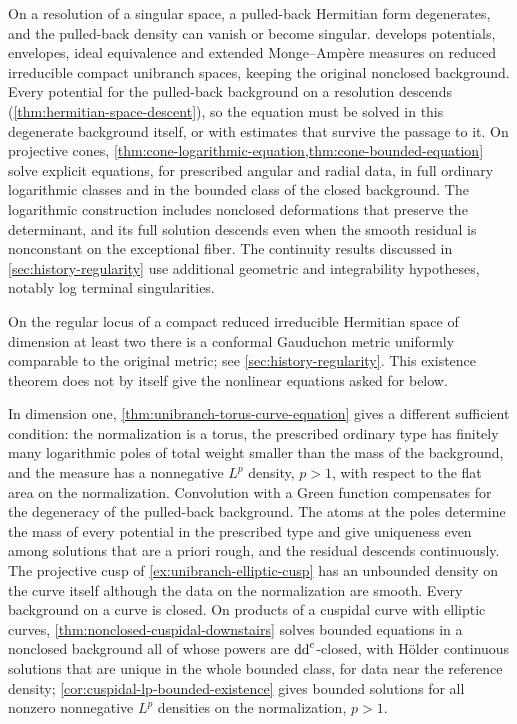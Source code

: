 On a resolution of a singular space, a pulled-back Hermitian form degenerates, and the pulled-back density can vanish or become singular.  develops potentials, envelopes, ideal equivalence and extended Monge--Amp\`ere measures on reduced irreducible compact unibranch spaces, keeping the original nonclosed background. Every potential for the pulled-back background on a resolution descends (\cref{thm:hermitian-space-descent}), so the equation must be solved in this degenerate background itself, or with estimates that survive the passage to it. On projective cones, \cref{thm:cone-logarithmic-equation,thm:cone-bounded-equation} solve explicit equations, for prescribed angular and radial data, in full ordinary logarithmic classes and in the bounded class of the closed background. The logarithmic construction includes nonclosed deformations that preserve the determinant, and its full solution descends even when the smooth residual is nonconstant on the exceptional fiber. The continuity results discussed in \cref{sec:history-regularity} use additional geometric and integrability hypotheses, notably log terminal singularities.

On the regular locus of a compact reduced irreducible Hermitian space of dimension at least two there is a conformal Gauduchon metric uniformly comparable to the original metric; see \cref{sec:history-regularity}. This existence theorem does not by itself give the nonlinear equations asked for below.

In dimension one, \cref{thm:unibranch-torus-curve-equation} gives a different sufficient condition: the normalization is a torus, the prescribed ordinary type has finitely many logarithmic poles of total weight smaller than the mass of the background, and the measure has a nonnegative $L^p$ density, $p>1$, with respect to the flat area on the normalization. Convolution with a Green function compensates for the degeneracy of the pulled-back background. The atoms at the poles determine the mass of every potential in the prescribed type and give uniqueness even among solutions that are a priori rough, and the residual descends continuously. The projective cusp of \cref{ex:unibranch-elliptic-cusp} has an unbounded density on the curve itself although the data on the normalization are smooth. Every background on a curve is closed. On products of a cuspidal curve with elliptic curves, \cref{thm:nonclosed-cuspidal-downstairs} solves bounded equations in a nonclosed background all of whose powers are $\mathrm{dd}^{\mathrm{c}}$-closed, with H\"older continuous solutions that are unique in the whole bounded class, for data near the reference density; \cref{cor:cuspidal-lp-bounded-existence} gives bounded solutions for all nonzero nonnegative $L^p$ densities on the normalization, $p>1$.

